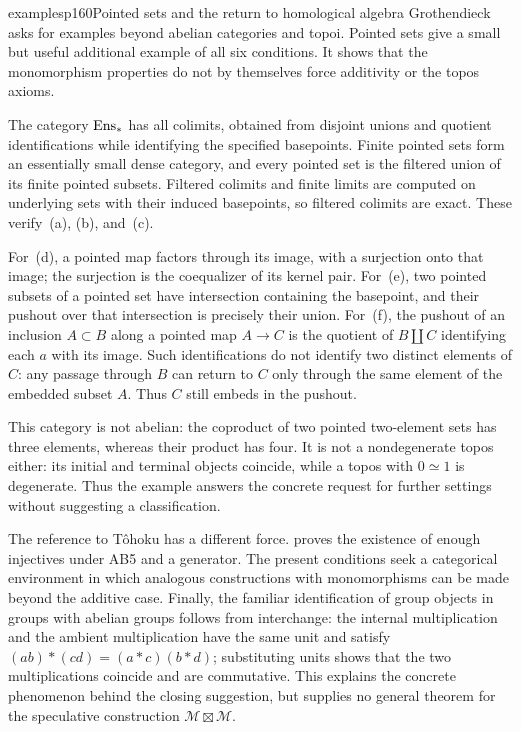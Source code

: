 \begin{dcomment}{examples}{p160}{Pointed sets and the return to homological algebra}
Grothendieck asks for examples beyond abelian categories and topoi. Pointed sets give a small but useful additional example of all six conditions. It shows that the monomorphism properties do not by themselves force additivity or the topos axioms.

The category $\mathrm{Ens}_*$ has all colimits, obtained from disjoint unions and quotient identifications while identifying the specified basepoints. Finite pointed sets form an essentially small dense category, and every pointed set is the filtered union of its finite pointed subsets. Filtered colimits and finite limits are computed on underlying sets with their induced basepoints, so filtered colimits are exact. These verify~(a), (b), and~(c).

For~(d), a pointed map factors through its image, with a surjection onto that image; the surjection is the coequalizer of its kernel pair. For~(e), two pointed subsets of a pointed set have intersection containing the basepoint, and their pushout over that intersection is precisely their union. For~(f), the pushout of an inclusion $A\subset B$ along a pointed map $A\to C$ is the quotient of $B\amalg C$ identifying each $a$ with its image. Such identifications do not identify two distinct elements of $C$: any passage through $B$ can return to $C$ only through the same element of the embedded subset $A$. Thus $C$ still embeds in the pushout.

This category is not abelian: the coproduct of two pointed two-element sets has three elements, whereas their product has four. It is not a nondegenerate topos either: its initial and terminal objects coincide, while a topos with $0\simeq1$ is degenerate. Thus the example answers the concrete request for further settings without suggesting a classification.

The reference to T\^ohoku has a different force. \citet[Theorem~1.10.1]{Grothendieck1957Tohoku} proves the existence of enough injectives under AB5 and a generator. The present conditions seek a categorical environment in which analogous constructions with monomorphisms can be made beyond the additive case. Finally, the familiar identification of group objects in groups with abelian groups follows from interchange: the internal multiplication and the ambient multiplication have the same unit and satisfy
$(ab)*(cd)=(a*c)(b*d)$; substituting units shows that the two multiplications coincide and are commutative. This explains the concrete phenomenon behind the closing suggestion, but supplies no general theorem for the speculative construction $\mathcal M\boxtimes\mathcal M$.
\end{dcomment}



